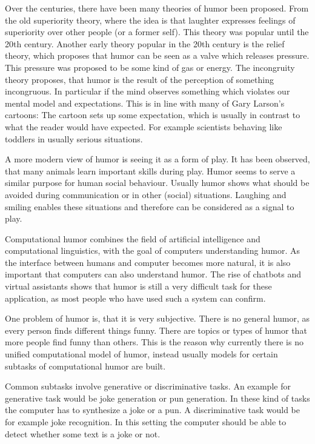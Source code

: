 \documentclass[draft,final,oneside]{vutinfth} %
\begin{document}
Over the centuries, there have been many theories of humor been proposed. From the old superiority theory, where the idea is that laughter expresses feelings of superiority over other people (or a former self). This theory was popular until the 20th century. Another early theory popular in the 20th century is the relief theory, which proposes that humor can be seen as a valve which releases pressure. This pressure was proposed to be some kind of gas or energy. The incongruity theory proposes, that humor is the result of the perception of something incongruous. In particular if the mind observes something which violates our mental model and expectations. This is in line with many of Gary Larson's cartoons: The cartoon sets up some expectation, which is usually in contrast to what the reader would have expected. For example scientists behaving like toddlers in usually serious situations. \cite{sep-humor}

A more modern view of humor is seeing it as a form of play. It has been observed, that many animals learn important skills during play. Humor seems to serve a similar purpose for human social behaviour. Usually humor shows what should be avoided during communication or in other (social) situations. Laughing and smiling enables these situations and therefore can be considered as a signal to play. 

Computational humor combines the field of artificial intelligence and computational linguistics, with the goal of computers understanding humor. As the interface between humans and computer becomes more natural, it is also important that computers can also understand humor. The rise of chatbots and virtual assistants shows that humor is still a very difficult task for these application, as most people who have used such a system can confirm.

One problem of humor is, that it is very subjective. There is no general humor, as every person finds different things funny. There are topics or types of humor that more people find funny than others. This is the reason why currently there is no unified computational model of humor, instead usually models for certain subtasks of computational humor are built.

Common subtasks involve generative or discriminative tasks. An example for generative task would be joke generation or pun generation. In these kind of tasks the computer has to synthesize a joke or a pun. A discriminative task would be for example joke recognition. In this setting the computer should be able to detect whether some text is a joke or not.
\end{document}
